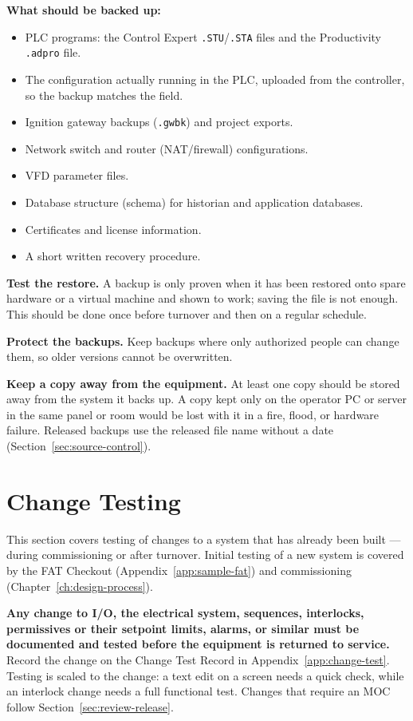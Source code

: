\textbf{What should be backed up:}
\begin{itemize}[itemsep=1pt]
  \item PLC programs: the Control Expert \texttt{.STU}/\texttt{.STA} files and the Productivity \texttt{.adpro} file.
  \item The configuration actually running in the PLC, uploaded from the controller, so the backup matches the field.
  \item Ignition gateway backups (\texttt{.gwbk}) and project exports.
  \item Network switch and router (NAT/firewall) configurations.
  \item VFD parameter files.
  \item Database structure (schema) for historian and application databases.
  \item Certificates and license information.
  \item A short written recovery procedure.
\end{itemize}

\textbf{Test the restore.} A backup is only proven when it has been restored onto spare hardware or a virtual machine and shown to work; saving the file is not enough. This should be done once before turnover and then on a regular schedule.

\textbf{Protect the backups.} Keep backups where only authorized people can change them, so older versions cannot be overwritten.

\textbf{Keep a copy away from the equipment.} At least one copy should be stored away from the system it backs up. A copy kept only on the operator PC or server in the same panel or room would be lost with it in a fire, flood, or hardware failure. Released backups use the released file name without a date (Section~\ref{sec:source-control}).

\section{Change Testing}\label{sec:change-testing}
This section covers testing of changes to a system that has already been built --- during commissioning or after turnover. Initial testing of a new system is covered by the FAT Checkout (Appendix~\ref{app:sample-fat}) and commissioning (Chapter~\ref{ch:design-process}).

\textbf{Any change to I/O, the electrical system, sequences, interlocks, permissives or their setpoint limits, alarms, or similar must be documented and tested before the equipment is returned to service.} Record the change on the Change Test Record in Appendix~\ref{app:change-test}. Testing is scaled to the change: a text edit on a screen needs a quick check, while an interlock change needs a full functional test. Changes that require an MOC follow Section~\ref{sec:review-release}.

